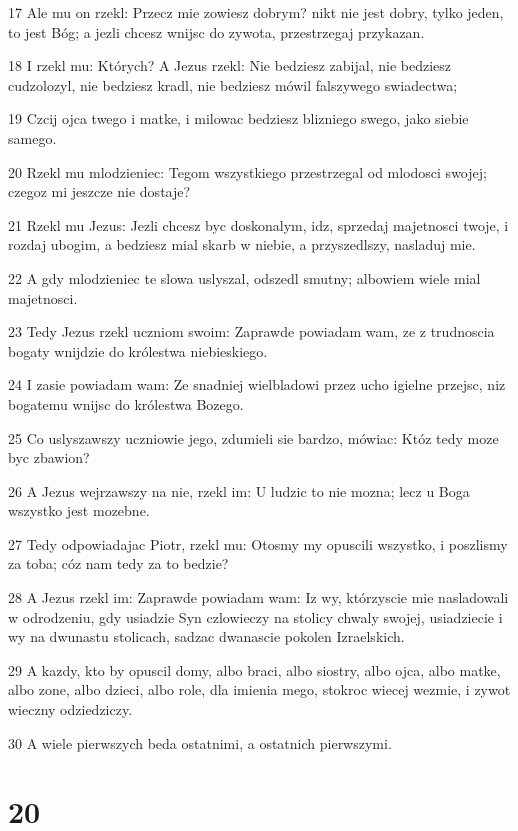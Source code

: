 \par 17 Ale mu on rzekl: Przecz mie zowiesz dobrym? nikt nie jest dobry, tylko jeden, to jest Bóg; a jezli chcesz wnijsc do zywota, przestrzegaj przykazan.
\par 18 I rzekl mu: Których? A Jezus rzekl: Nie bedziesz zabijal, nie bedziesz cudzolozyl, nie bedziesz kradl, nie bedziesz mówil falszywego swiadectwa;
\par 19 Czcij ojca twego i matke, i milowac bedziesz blizniego swego, jako siebie samego.
\par 20 Rzekl mu mlodzieniec: Tegom wszystkiego przestrzegal od mlodosci swojej; czegoz mi jeszcze nie dostaje?
\par 21 Rzekl mu Jezus: Jezli chcesz byc doskonalym, idz, sprzedaj majetnosci twoje, i rozdaj ubogim, a bedziesz mial skarb w niebie, a przyszedlszy, nasladuj mie.
\par 22 A gdy mlodzieniec te slowa uslyszal, odszedl smutny; albowiem wiele mial majetnosci.
\par 23 Tedy Jezus rzekl uczniom swoim: Zaprawde powiadam wam, ze z trudnoscia bogaty wnijdzie do królestwa niebieskiego.
\par 24 I zasie powiadam wam: Ze snadniej wielbladowi przez ucho igielne przejsc, niz bogatemu wnijsc do królestwa Bozego.
\par 25 Co uslyszawszy uczniowie jego, zdumieli sie bardzo, mówiac: Któz tedy moze byc zbawion?
\par 26 A Jezus wejrzawszy na nie, rzekl im: U ludzic to nie mozna; lecz u Boga wszystko jest mozebne.
\par 27 Tedy odpowiadajac Piotr, rzekl mu: Otosmy my opuscili wszystko, i poszlismy za toba; cóz nam tedy za to bedzie?
\par 28 A Jezus rzekl im: Zaprawde powiadam wam: Iz wy, którzyscie mie nasladowali w odrodzeniu, gdy usiadzie Syn czlowieczy na stolicy chwaly swojej, usiadziecie i wy na dwunastu stolicach, sadzac dwanascie pokolen Izraelskich.
\par 29 A kazdy, kto by opuscil domy, albo braci, albo siostry, albo ojca, albo matke, albo zone, albo dzieci, albo role, dla imienia mego, stokroc wiecej wezmie, i zywot wieczny odziedziczy.
\par 30 A wiele pierwszych beda ostatnimi, a ostatnich pierwszymi.

\chapter{20}

